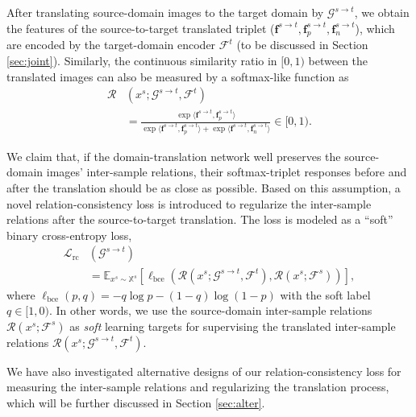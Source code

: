 \documentclass[journal]{IEEEtran}
\def\vf{{\bm{f}}}
\def\sX{{\mathbb{X}}}
\begin{document}
After translating source-domain images to the target domain by $\mathcal{G}^{s \to t}$, we obtain the features of the source-to-target translated triplet
(${\vf}^{s \to t}, {\vf}^{s \to t}_p, {\vf}^{s \to t}_n$), which are encoded by the target-domain encoder $\mathcal{F}^t$ (to be discussed in Section \ref{sec:joint}).
Similarly, the continuous similarity ratio in $[0,1)$ between the translated images can also be measured by a softmax-like function as
{
\begin{align}
\mathcal{R}&(x^s; \mathcal{G}^{s \to t}, \mathcal{F}^t) \nonumber \\
&= \frac{\exp \langle {\vf}^{s \to t}, {\vf}^{s \to t}_p \rangle}
{\exp \langle {\vf}^{s \to t}, {\vf}^{s \to t}_p\rangle  + \exp \langle {\vf}^{s \to t}, {\vf}^{s \to t}_n\rangle} \in [0,1).
\label{eq:rel_T}
\end{align}}

We claim that, if the domain-translation network well preserves the source-domain images' inter-sample relations, their softmax-triplet responses before and after the translation should be as close as possible.
Based on this assumption, a novel relation-consistency loss is introduced to regularize the inter-sample relations after the source-to-target translation. The loss is modeled as a ``soft'' binary cross-entropy loss,
{
\begin{align}
\label{eq:sc}
\mathcal{L}_\text{rc}&(\mathcal{G}^{s\to t}) \nonumber \\
&=
\mathbb{E}_{x^s\sim \sX^s} \left[ \ell_\text{bce} \left( \mathcal{R}(x^s; \mathcal{G}^{s \to t}, \mathcal{F}^t),  \mathcal{R}(x^s; \mathcal{F}^s) \right) \right],
\end{align}}where $\ell_\text{bce}(p, q) = - q \log p - \left(1- q\right) \log \left( 1-p\right)$ with the soft label $q \in [1,0)$. In other words, we use the source-domain inter-sample relations $\mathcal{R}(x^s; \mathcal{F}^s)$ as \emph{soft} learning targets for supervising the translated inter-sample relations $\mathcal{R}(x^s; \mathcal{G}^{s \to t}, \mathcal{F}^t)$.

We have also investigated alternative designs of our relation-consistency loss for measuring the inter-sample relations and regularizing the translation process, which will be further discussed in Section \ref{sec:alter}.
\end{document}
